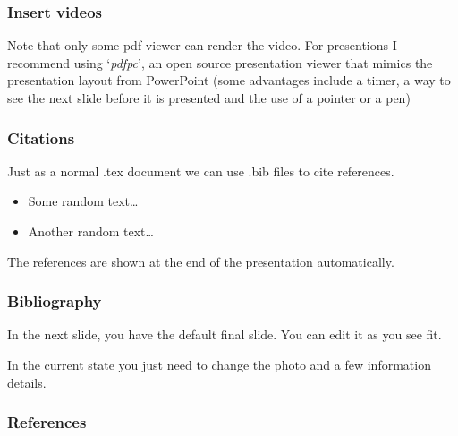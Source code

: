\documentclass[8pt, hyperref={bookmarks=false},aspectratio=169, xcolor=table]{beamer}
\begin{document}

\begin{frame}\frametitle{Insert videos}
    \begin{center}  
    \end{center}
    \vspace{0.5cm}
    Note that only some pdf viewer can render the video. For presentions I recommend using `\textit{pdfpc}', an open source presentation viewer that mimics the presentation layout from PowerPoint (some advantages include a timer, a way to see the next slide before it is presented and the use of a pointer or a pen)
\end{frame}



\begin{frame}\frametitle{Citations}
  Just as a normal .tex document we can use .bib files to cite references. 
  \vspace{0.5cm}
  \begin{itemize}
    \item Some random text\ldots~\cite{Smith1986}
    \item Another random text\ldots~\cite{
      Parrilo2003, Muldowney1990}
  \end{itemize}

  \vspace{0.5cm}
  The references are shown at the end of the presentation automatically. 
  
\end{frame}


\begin{frame}\frametitle{Bibliography}
  
  In the next slide, you have the default final slide. You can edit it as you see fit. 

  In the current state you just need to change the photo and a few information details.
\end{frame}





\begin{frame}[allowframebreaks]
    \frametitle{References}
    
\end{frame}


%
\end{document}
